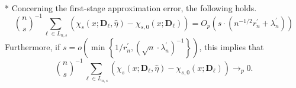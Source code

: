 \begin{boxD}
    \begin{lem}\label{lem:fs_approx_error}\mbox{}\\*
    Concerning the first-stage approximation error, the following holds.
        \begin{equation}
         \binom{n}{s}^{-1}\sum_{\ell \in L_{n,s}}\left(\chi_{s}\left(x; \mathbf{D}_{\ell}, \hat{\eta}\right) - \chi_{s,0}\left(x; \mathbf{D}_{\ell}\right)\right)
         = O_{p}\left(s \cdot \left(n^{-1/2} r_{n}^{\prime} + \lambda_{n}^{\prime}\right)\right)
    \end{equation}
    Furthermore, if $s = o\left(\min\left\{1/r_{n}^{\prime}, \left(\sqrt{n} \cdot \lambda_{n}^{\prime}\right)^{-1}\right\}\right)$, this implies that 
    \begin{equation}
        \binom{n}{s}^{-1}\sum_{\ell \in L_{n,s}}\left(\chi_{s}\left(x; \mathbf{D}_{\ell}, \hat{\eta}\right) - \chi_{s,0}\left(x; \mathbf{D}_{\ell}\right)\right)
        \longrightarrow_{p} 0.
    \end{equation}
\end{lem}
\end{boxD}

